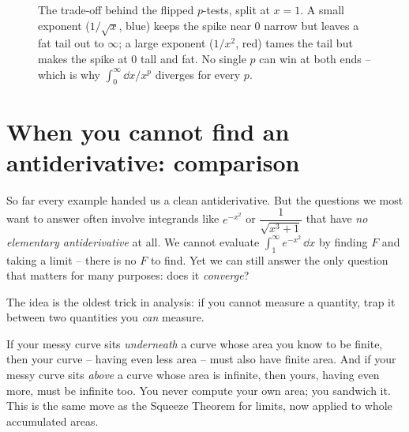 \begin{figure}[H]
\centering
{}
\caption{The trade-off behind the flipped $p$-tests, split at $x=1$. A small
exponent ($1/\sqrt x$, blue) keeps the spike near $0$ narrow but leaves a fat tail
out to $\infty$; a large exponent ($1/x^2$, red) tames the tail but makes the spike
at $0$ tall and fat. No single $p$ can win at both ends -- which is why
$\int_0^\infty \dd x/x^p$ diverges for every $p$.}
\label{ch25:fig-tradeoff}
\end{figure}

\section{When you cannot find an antiderivative: comparison}
\label{ch25:comparison}

So far every example handed us a clean antiderivative. But the questions we most
want to answer often involve integrands like $e^{-x^2}$ or
$\dfrac{1}{\sqrt{x^3+1}}$ that have \emph{no elementary antiderivative} at all. We
cannot evaluate $\int_1^\infty e^{-x^2}\,\dd x$ by finding $F$ and taking a limit --
there is no $F$ to find. Yet we can still answer the only question that matters
for many purposes: does it \emph{converge}?

The idea is the oldest trick in analysis: if you cannot measure a quantity, trap
it between two quantities you \emph{can} measure.

\begin{intuitionbox}
If your messy curve sits \emph{underneath} a curve whose area you know to be
finite, then your curve -- having even less area -- must also have finite area. And
if your messy curve sits \emph{above} a curve whose area is infinite, then yours,
having even more, must be infinite too. You never compute your own area; you
sandwich it. This is the same move as the Squeeze Theorem for limits, now applied
to whole accumulated areas.
\end{intuitionbox}

